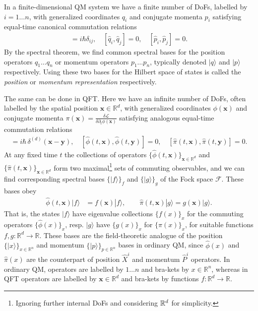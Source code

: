 \documentclass[../QFT_main.tex]{subfiles}
\begin{document}
\begin{mytheorem}
%
In a finite-dimensional QM system we have a finite number of DoFs, labelled by $i=1\dots n$, with generalized coordinates $q_i$ and conjugate momenta $p_i$ satisfying equal-time canonical commutation relations
\begin{align}
    [\hat{q}_i, \hat{p}_j] = i \hbar \delta_{ij}, \quad
    [\hat{q}_i, \hat{q}_j] = 0, \quad
    [\hat{p}_i, \hat{p}_j] = 0.
\end{align}
By the spectral theorem, we find common spectral bases for the position operators $q_1\dots q_n$ or momentum operators $p_1\dots p_n$, typically denoted $|q\rangle$ and $|p\rangle$ respectively.
Using these two bases for the Hilbert space of states is called the \emph{position} or \emph{momentum representation} respectively.

The same can be done in QFT.
Here we have an infinite number of DoFs, often labelled by the spatial position $\mathbf{x} \in \mathbb{R}^d$, with generalized coordinates $\phi(\mathbf{x})$ and conjugate momenta $\pi(\mathbf{x})=\frac{\delta \mathcal{L}}{\delta \partial_t \phi(\mathbf{x})}$ satisfying analogous equal-time commutation relations 
\begin{align}
    [\hat{\phi}(t, \mathbf{x}), \hat{\pi}(t, \mathbf{y})] = i \hbar \,\delta^{(d)}(\mathbf{x} - \mathbf{y}), \quad
    [\hat{\phi}(t, \mathbf{x}), \hat{\phi}(t, \mathbf{y})] = 0, \quad
    [\hat{\pi}(t, \mathbf{x}), \hat{\pi}(t, \mathbf{y})] = 0.
\end{align}
%
At any fixed time $t$ the collections of operators $\{\hat{\phi}(t, \mathbf{x})\}_{\mathbf{x}\in \mathbb{R}^d}$ and $\{\hat{\pi}(t, \mathbf{x})\}_{\mathbf{x}\in \mathbb{R}^d}$ form two maximal\footnote{Ignoring further internal DoFs and considering $\mathbb{R}^d$ for simplicity.} sets of commuting observables, and we can find corresponding spectral bases $\{|f\rangle\}_{f}$ and $\{|g\rangle\}_{g}$ of the Fock space $\mathcal{F}$.
%
These bases obey
\begin{align}
    \hat{\phi}(t, \mathbf{x}) |f\rangle &= f(\mathbf{x}) |f\rangle, \qquad
    \hat{\pi}(t, \mathbf{x}) |g\rangle = g(\mathbf{x}) |g\rangle.
\end{align}
That is, the states $|f\rangle$ have eigenvalue collections $\{f(x)\}_{x}$ for the commuting operators $\{\hat{\phi}(x)\}_x$, resp. $|g\rangle$ have $\{g(x)\}_x$ for $\{\hat{\pi}(x)\}_x$, for suitable functions $f,g:\mathbb{R}^d \to \mathbb{R}$.
%
These bases are the field-theoretic analogue of the position $\{|x\rangle\}_{x\in \mathbb{R}^n}$ and momentum $\{|p\rangle\}_{p\in \mathbb{R}^n}$ bases in ordinary QM, since $\hat{\phi}(x)$ and $\hat{\pi}(x)$ are the counterpart of position $\hat{X}^i$ and momentum $\hat{P}^i$ operators.
In ordinary QM, operators are labelled by $1\dots n$ and bra-kets by $x\in \mathbb{R}^n$, whereas in QFT operators are labelled by $\mathbf{x}\in \mathbb{R}^d$ and bra-kets by functions $f:\mathbb{R}^d \to \mathbb{R}$.


\end{mytheorem}
\end{document}
